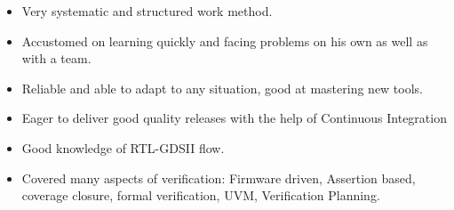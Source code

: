 

\begin{cvparagraph}
  \begin{itemize}[nosep, noitemsep]
    \item {Very systematic and structured work method.}
    \item {Accustomed on learning quickly and facing problems on his own as well as with a team.}
    \item {Reliable and able to adapt to any situation, good at mastering new tools.}
    \item {Eager to deliver good quality releases with the help of Continuous Integration}
    \item {Good knowledge of RTL-GDSII flow.}
    \item {Covered many aspects of verification: Firmware driven, Assertion based, coverage closure, formal verification, UVM, Verification Planning.}
  \end{itemize}
\end{cvparagraph}
